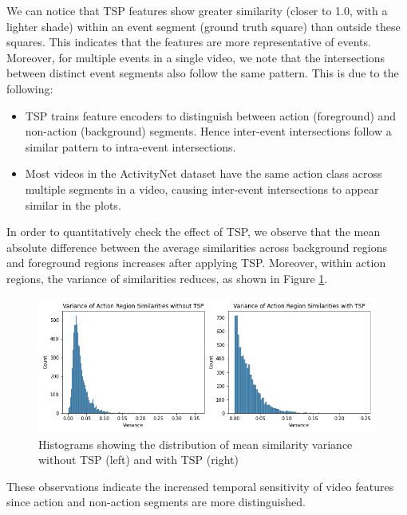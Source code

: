 \par We can notice that TSP features show greater similarity (closer to 1.0, with a lighter shade) within an event segment (ground truth square) than outside these squares. This indicates that the features are more representative of events. Moreover, for multiple events in a single video, we note that the intersections between distinct event segments also follow the same pattern. This is due to the following: 
\begin{itemize}
	\item TSP trains feature encoders to distinguish between action (foreground) and non-action (background) segments. Hence inter-event intersections follow a similar pattern to intra-event intersections.
	\item Most videos in the ActivityNet dataset have the same action class across multiple segments in a video, causing inter-event intersections to appear similar in the plots.
\end{itemize}


\par In order to quantitatively check the effect of TSP, we observe that the mean absolute difference between the average similarities across background regions and foreground regions increases after applying TSP. Moreover, within action regions, the variance of similarities reduces, as shown in Figure \ref{fig:tsp-action-var}.


\begin{figure}
    \includegraphics[width=\linewidth]{assets/img/tsp/tsp-action-sim.png}
    \caption{Histograms showing the distribution of mean similarity variance without TSP (left) and with TSP (right)}

	\label{fig:tsp-action-var}
\end{figure}

\par These observations indicate the increased temporal sensitivity of video features since action and non-action segments are more distinguished.